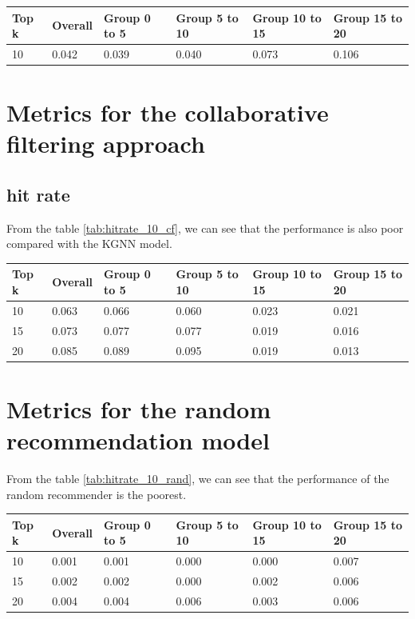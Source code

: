 \documentclass[11pt,twoside]{report}
\begin{document}
\begin{center}
    \begin{tabular}{l | l | l | l | l | l}
    \hline
    Top k & Overall & Group 0 to 5 & Group 5 to 10 & Group 10 to 15 & Group 15 to 20 \\
    \hline
    10 & 0.042 & 0.039 & 0.040 & 0.073 & 0.106 \\
    \end{tabular}
    \label{tab:hitrate_10_tf-idf}
\end{center}

\section{Metrics for the collaborative filtering approach}
\subsection{hit rate}
From the table \ref{tab:hitrate_10_cf}, we can see that the performance is also poor compared with the KGNN model.

\begin{center}
    \begin{tabular}{l | l | l | l | l | l}
    \hline
    Top k & Overall & Group 0 to 5 & Group 5 to 10 & Group 10 to 15 & Group 15 to 20 \\
    \hline
    10 & 0.063 & 0.066 & 0.060 & 0.023 & 0.021 \\
    15 & 0.073 & 0.077 & 0.077 & 0.019 & 0.016 \\
    20 & 0.085 & 0.089 & 0.095 & 0.019 & 0.013 \\
    \end{tabular}
    \label{tab:hitrate_10_cf}
\end{center}

\section{Metrics for the random recommendation model}
From the table \ref{tab:hitrate_10_rand}, we can see that the performance of the random recommender is the poorest.

\begin{center}
    \begin{tabular}{l | l | l | l | l | l}
    \hline
    Top k & Overall & Group 0 to 5 & Group 5 to 10 & Group 10 to 15 & Group 15 to 20 \\
    \hline
    10 & 0.001 & 0.001 & 0.000 & 0.000 & 0.007 \\
    15 & 0.002 & 0.002 & 0.000 & 0.002 & 0.006 \\
    20 & 0.004 & 0.004 & 0.006 & 0.003 & 0.006 \\
    \end{tabular}
    \label{tab:hitrate_10_rand}
\end{center}
\end{document}

